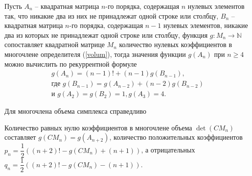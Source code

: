 \documentclass[a4paper,11pt,twoside]{article}
\begin{document}
\begin{lem} Пусть $A_n$ -- квадратная матрица $n$-го порядка, содержащая $n$ нулевых элементов так, что никакие два из них не принадлежат одной строке или столбцу, $B_n$ -- квадратная матрица $n$-го порядка, содержащая $n-1$ нулевых элементов, никакие два из которых не принадлежат одной строке или столбцу, функция $g: M_n \to \mathbb{N}$ сопоставляет квадратной матрице $M_n$ количество нулевых коэффициентов в многочлене определителя (\ref{volum}), тогда значения функции $g(A_n)$ при $n \geq 4$ можно вычислить по рекуррентной формуле
\begin{multline*}
g(A_n)=(n-1)!+(n-1)g(B_{n-1}), 
\\
\text{где } g(B_{n-1})=g(A_{n-2})+(n-2)g(B_{n-2})
\\
\text{и } g(A_2)=g(B_2)=1, g(A_3)=4.
\end{multline*}
\end{lem}

Для многочлена объема симплекса справедливо
\begin{crl} Количество равных нулю коэффициентов в многочлене объема $\det(CM_n)$ составляет $ g(CM_n)=g(A_{n+2})$, количество положительных коэффициентов $p_n=\dfrac{1}{2} \left( (n+2)!-g(CM_n)+(n+1) \right)$, а отрицательных $q_n=\dfrac{1}{2} \left( (n+2)!- g(CM_n)-(n+1)\right)$. 
\end{crl}

\end{document}
